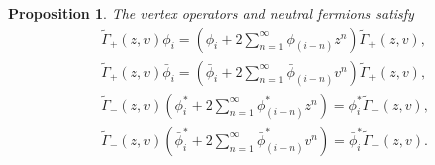 \documentclass[11pt,reqno]{amsart}
\numberwithin{equation}{section}
\newtheorem{proposition}[theorem]{Proposition}
\begin{document}
	\begin{proposition}
		The vertex operators and neutral fermions satisfy
		\begin{align}
			&\tilde{\Gamma}_+(z,v)\phi_{i}
			=\left( \phi_i + 2\sum_{n=1}^{\infty} \phi_{(i-n)} z^n \right)
			\tilde{\Gamma}_+(z,v),\\		
			&\tilde{\Gamma}_+(z,v)\bar{\phi}_{i}
			=\left( \bar{\phi}_i + 2\sum_{n=1}^{\infty} \bar{\phi}_{(i-n)} v^n \right)
			\tilde{\Gamma}_+(z,v),	\\
			&\tilde{\Gamma}_-(z,v)\left( \phi_i^* + 2\sum_{n=1}^{\infty}  \phi_{(i-n)}^*  z^n \right)	
			=\phi_{i}^*\tilde{\Gamma}_-(z,v),\label{Gamma-phi}	\\
			&\tilde{\Gamma}_-(z,v)\left( \bar{\phi}_i^* + 2\sum_{n=1}^{\infty}  \bar{\phi}_{(i-n)}^*  v^n \right)	
			=\bar{\phi}_{i}^*\tilde{\Gamma}_-(z,v).
		\end{align}
	\end{proposition}
\end{document}

